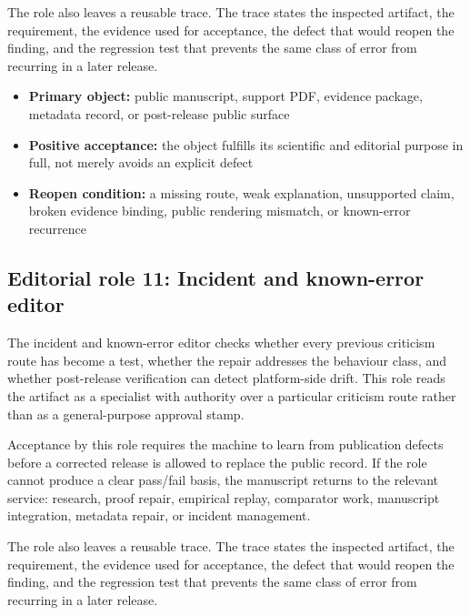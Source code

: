 The role also leaves a reusable trace. The trace states the inspected artifact, the requirement, the evidence used for acceptance, the defect that would reopen the finding, and the regression test that prevents the same class of error from recurring in a later release.


\begin{itemize}[leftmargin=1.8em]

\item \textbf{Primary object:} public manuscript, support PDF, evidence package, metadata record, or post-release public surface

\item \textbf{Positive acceptance:} the object fulfills its scientific and editorial purpose in full, not merely avoids an explicit defect

\item \textbf{Reopen condition:} a missing route, weak explanation, unsupported claim, broken evidence binding, public rendering mismatch, or known-error recurrence

\end{itemize}

\subsection{Editorial role 11: Incident and known-error editor}

The incident and known-error editor checks whether every previous criticism route has become a test, whether the repair addresses the behaviour class, and whether post-release verification can detect platform-side drift. This role reads the artifact as a specialist with authority over a particular criticism route rather than as a general-purpose approval stamp.


Acceptance by this role requires the machine to learn from publication defects before a corrected release is allowed to replace the public record. If the role cannot produce a clear pass/fail basis, the manuscript returns to the relevant service: research, proof repair, empirical replay, comparator work, manuscript integration, metadata repair, or incident management.


The role also leaves a reusable trace. The trace states the inspected artifact, the requirement, the evidence used for acceptance, the defect that would reopen the finding, and the regression test that prevents the same class of error from recurring in a later release.


